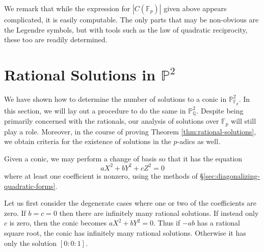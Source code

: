 \documentclass[10pt,a4paper]{amsart}
\numberwithin{equation}{section}
\numberwithin{figure}{section}
\numberwithin{table}{section}
\theoremstyle{definition}
\theoremstyle{plain}
\theoremstyle{remark}
\theoremstyle{plain}
\theoremstyle{definition}
\theoremstyle{plain}
\theoremstyle{plain}
\renewcommand{\P}{\mathbb{P}}
\newcommand{\F}{\mathbb{F}}
\newcommand{\Q}{\mathbb{Q}}
\begin{document}
	\begin{comment}
	Consolidate with Example~4.4!
	\textcolor{red}{Note that if we are in case \eqref{case:0} of Proposition~\ref{prop:counting-P1-solutions}, i.e., if $a=b=c=0$, then $\gamma$ is a residue if and only if $-1$ is. Thus, by Theorem~\ref{thm:diag-P2}, we cannot be in cases \eqref{case:rank2_x^2+y^2=0} or \eqref{case:rank2_x^2+ry^2=0} of Proposition~\ref{prop:counting-P2-solutions} where the projectivized conic has only $1$ solution. Were this the case, Lemma~\ref{lem:relate-solutions-affine-proj} would imply that our affine conic has a negative number (to be exact, $-p$) of solutions!}
	\end{comment}
	
	We remark that while the expression for $|C(\F_p)|$ given above appears complicated, it is easily computable. The only parts that may be non-obvious are the Legendre symbols, but with tools such as the law of quadratic reciprocity, these too are readily determined.
	
	\section{Rational Solutions in $\P^2$}\label{sec:rational-soln}
	We have shown how to determine the number of solutions to a conic in $\P^2_{\F_p}$. In this section, we will lay out a procedure to do the same in $\P^2_\Q$. Despite being primarily concerned with the rationals, our analysis of solutions over $\F_p$ will still play a role. Moreover, in the course of proving Theorem \ref{thm:rational-solutions}, we obtain criteria for the existence of solutions in the $p$-adics as well.
	
	Given a conic, we may perform a change of basis so that it has the equation
	\[
	aX^2 + bY^2 + cZ^2 = 0
	\]
	where at least one coefficient is nonzero, using the methods of \S\ref{sec:diagonalizing-quadratic-forms}.
	
	Let us first consider the degenerate cases where one or two of the coefficients are zero. If $b=c=0$ then there are infinitely many rational solutions.
	If instead only $c$ is zero, then the conic becomes $aX^2 + bY^2 = 0$. Thus if $-ab$ has a rational square root, the conic has infinitely many rational solutions. Otherwise it has only the solution $[0:0:1]$.
	
\end{document}
